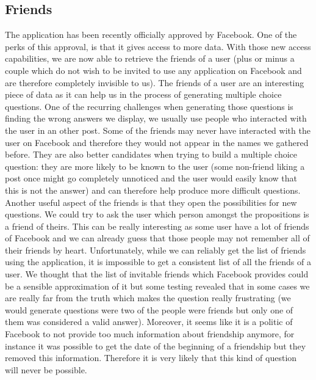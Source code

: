 \subsection{Friends}
The application has been recently officially approved by Facebook. One of the perks of this approval, is that it gives access to more data. With those new access capabilities, we are now able to retrieve the friends of a user (plus or minus a couple which do not wish to be invited to use any application on Facebook and are therefore completely invisible to us). The friends of a user are an interesting piece of data as it can help us in the process of generating multiple choice questions. One of the recurring challenges when generating those questions is finding the wrong answers we display, we usually use people who interacted with the user in an other post. Some of the friends may never have interacted with the user on Facebook and therefore they would not appear in the names we gathered before. They are also better candidates when trying to build a multiple choice question: they are more likely to be known to the user (some non-friend liking a post once might go completely unnoticed and the user would easily know that this is not the answer) and can therefore help produce more difficult questions.\\
Another useful aspect of the friends is that they open the possibilities for new questions. We could try to ask the user which person amongst the propositions is a friend of theirs. This can be really interesting as some user have a lot of friends of Facebook and we can already guess that those people may not remember all of their friends by heart. Unfortunately, while we can reliably get the list of friends using the application, it is impossible to get a consistent list of all the friends of a user. We thought that the list of invitable friends which Facebook provides could be a sensible approximation of it but some testing revealed that in some cases we are really far from the truth which makes the question really frustrating (we would generate questions were two of the people were friends but only one of them was considered a valid answer). Moreover, it seems like it is a politic of Facebook to not provide too much information about friendship anymore, for instance it was possible to get the date of the beginning of a friendship but they removed this information. Therefore it is very likely that this kind of question will never be possible.
